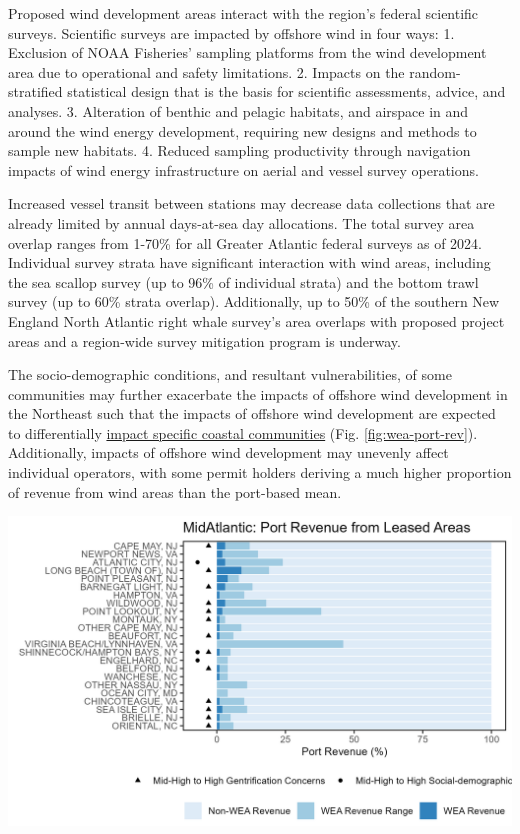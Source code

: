 \documentclass[
  10pt,
]{article}
\let\origfigure\figure
\let\endorigfigure\endfigure
\renewenvironment{figure}[1][2] {
    \expandafter\origfigure\expandafter[H]
} {
    \endorigfigure
}
\begin{document}
Proposed wind development areas interact with the region's federal scientific surveys. Scientific surveys are impacted by offshore wind in four ways:
1. Exclusion of NOAA Fisheries' sampling platforms from the wind development area due to operational and safety limitations.
2. Impacts on the random-stratified statistical design that is the basis for scientific assessments, advice, and analyses.
3. Alteration of benthic and pelagic habitats, and airspace in and around the wind energy development, requiring new designs and methods to sample new habitats.
4. Reduced sampling productivity through navigation impacts of wind energy infrastructure on aerial and vessel survey operations.

Increased vessel transit between stations may decrease data collections that are already limited by annual days-at-sea day allocations. The total survey area overlap ranges from 1-70\% for all Greater Atlantic federal surveys as of 2024. Individual survey strata have significant interaction with wind areas, including the sea scallop survey (up to 96\% of individual strata) and the bottom trawl survey (up to 60\% strata overlap). Additionally, up to 50\% of the southern New England North Atlantic right whale survey's area overlaps with proposed project areas and a region-wide survey mitigation program is underway.

The socio-demographic conditions, and resultant vulnerabilities, of some communities may further exacerbate the impacts of offshore wind development in the Northeast such that the impacts of offshore wind development are expected to differentially \href{https://noaa-edab.github.io/catalog/wind_port.html}{impact specific coastal communities} (Fig. \ref{fig:wea-port-rev}). Additionally, impacts of offshore wind development may unevenly affect individual operators, with some permit holders deriving a much higher proportion of revenue from wind areas than the port-based mean.

\begin{figure}

\includegraphics[width=6.5in]{images/MidAtlantic/wea_port_rev_MidAtlantic_2025-09-05} \hfill{}

\caption{Percent of Mid-Atlantic port revenue from Wind Energy Areas (WEA) in descending order from most to least port revenue from WEA.}\label{fig:wea-port-rev}
\end{figure}
\end{document}
